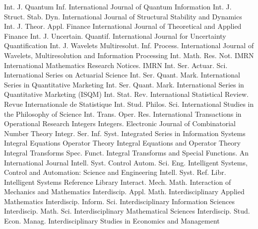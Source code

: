 {Int. J. Quantum Inf.}
{International Journal of Quantum Information}
{Int. J. Struct. Stab. Dyn.}
{International Journal of Structural Stability and Dynamics}
{Int. J. Theor. Appl. Finance}
{International Journal of Theoretical and Applied Finance}
{Int. J. Uncertain. Quantif.}
{International Journal for Uncertainty Quantification}
{Int. J. Wavelets Multiresolut. Inf. Process.}
{International Journal of Wavelets, Multiresolution and Information Processing}
{Int. Math. Res. Not. IMRN}
{International Mathematics Research Notices. IMRN}
{Int. Ser. Actuar. Sci.}
{International Series on Actuarial Science}
{Int. Ser. Quant. Mark.}
{International Series in Quantitative Marketing}
{Int. Ser. Quant. Mark.}
{International Series in Quantitative Marketing (ISQM)}
{Int. Stat. Rev.}
{International Statistical Review. Revue Internationale de Statistique}
{Int. Stud. Philos. Sci.}
{International Studies in the Philosophy of Science}
{Int. Trans. Oper. Res.}
{International Transactions in Operational Research}
{Integers}
{Integers. Electronic Journal of Combinatorial Number Theory}
{Integr. Ser. Inf. Syst.}
{Integrated Series in Information Systems}
{Integral Equations Operator Theory}
{Integral Equations and Operator Theory}
{Integral Transforms Spec. Funct.}
{Integral Transforms and Special Functions. An International Journal}
{Intell. Syst. Control Autom. Sci. Eng.}
{Intelligent Systems, Control and Automation: Science and Engineering}
{Intell. Syst. Ref. Libr.}
{Intelligent Systems Reference Library}
{Interact. Mech. Math.}
{Interaction of Mechanics and Mathematics}
{Interdiscip. Appl. Math.}
{Interdisciplinary Applied Mathematics}
{Interdiscip. Inform. Sci.}
{Interdisciplinary Information Sciences}
{Interdiscip. Math. Sci.}
{Interdisciplinary Mathematical Sciences}
{Interdiscip. Stud. Econ. Manag.}
{Interdisciplinary Studies in Economics and Management}
